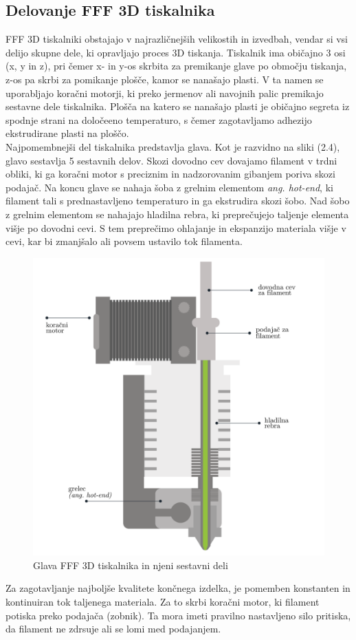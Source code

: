 \documentclass[12pt]{report}
\begin{document}
\subsection{Delovanje \ac{FFF} 3D tiskalnika}
\ac{FFF} 3D tiskalniki obstajajo v najrazličnejših velikostih in izvedbah, vendar si vsi delijo skupne dele, ki opravljajo proces 3D tiskanja. Tiskalnik ima običajno 3 osi (x, y in z), pri čemer x- in y-os skrbita za premikanje glave po
območju tiskanja, z-os pa skrbi za pomikanje plošče, kamor se nanašajo plasti. V ta namen se uporabljajo koračni motorji, ki preko jermenov ali navojnih palic premikajo sestavne dele tiskalnika. Plošča na katero se nanašajo plasti je običajno segreta iz spodnje strani na določeeno temperaturo, s čemer zagotavljamo
adhezijo ekstrudirane plasti na ploščo. \\
Najpomembnejši del tiskalnika predstavlja glava. Kot je razvidno na sliki (2.4), glavo sestavlja 5 sestavnih delov. Skozi dovodno cev dovajamo filament v trdni obliki, ki ga koračni motor s preciznim in nadzorovanim gibanjem poriva skozi podajač. Na koncu glave se nahaja šoba z grelnim elementom \textit{ang. hot-end}, ki filament tali s prednastavljeno temperaturo
in ga ekstrudira skozi šobo. Nad šobo z grelnim elementom se nahajajo hladilna rebra, ki preprečujejo taljenje elementa višje po dovodni cevi. S tem preprečimo ohlajanje in ekspanzijo materiala višje v cevi, kar bi zmanjšalo ali povsem ustavilo tok filamenta.
\begin{figure}[H]
  \centering
  \includegraphics[scale=0.5]{Images/extruder.png}
  \caption{Glava FFF 3D tiskalnika in njeni sestavni deli \cite{leapfrog}}
\end{figure}
\noindent Za zagotavljanje najboljše kvalitete končnega izdelka, je pomemben konstanten in kontinuiran tok taljenega materiala. Za to skrbi koračni motor, ki filament potiska preko
podajača (zobnik). Ta mora imeti pravilno nastavljeno silo pritiska, da filament ne zdrsuje ali se lomi med podajanjem. \cite{fff_article}
\end{document}
